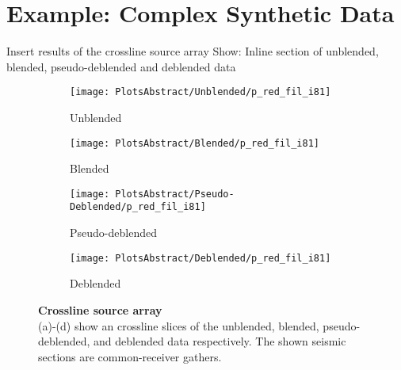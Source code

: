 \documentclass{madrid15WS}
\begin{document}
\section{Example: Complex Synthetic Data}

Insert results of the crossline source array
Show: Inline section of unblended, blended, pseudo-deblended and deblended data

\begin{figure}
	\centering
	\begin{subfigure}[t]{0.2\textwidth}
		\centering
		\texttt{[image: PlotsAbstract/Unblended/p\_red\_fil\_i81]}
		\caption{Unblended}
		\label{fig:Example-Unblendedx}
	\end{subfigure}
	\centering
	\begin{subfigure}[t]{0.11286\textwidth}
		\centering
		\texttt{[image: PlotsAbstract/Blended/p\_red\_fil\_i81]}
		\caption{Blended}
		\label{fig:Example-Blendedx}
	\end{subfigure}
	\centering
	\begin{subfigure}[t]{0.2\textwidth}
		\centering
		\texttt{[image: PlotsAbstract/Pseudo-Deblended/p\_red\_fil\_i81]} %
		\caption{Pseudo-deblended}
		\label{fig:Example-Pseudox}
	\end{subfigure}
	\centering
	\begin{subfigure}[t]{0.2\textwidth}
		\centering
		\texttt{[image: PlotsAbstract/Deblended/p\_red\_fil\_i81]} %
		\caption{Deblended}
		\label{fig:Example-Deblendedx}
	\end{subfigure}
		
	\caption{\textbf{Crossline source array}\\(a)-(d) show an crossline slices of the unblended, blended, pseudo-deblended, and deblended data respectively. The shown seismic sections are common-receiver gathers.}
	\label{fig:Example-Inline-Slices}

\end{figure}
\end{document}
